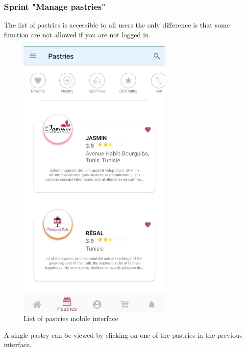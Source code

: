 \documentclass[12pt,a4paper]{report}
\begin{document}
\subsubsection*{Sprint "Manage pastries"}
The list of pastries is accessible to all users the only difference is that some function are not allowed if you are not logged in.
\begin{figure}[H]
	\centering
	\includegraphics[width=3in,keepaspectratio]{pastriesListmobile.jpg}
	\caption{List of pastries mobile interface}
	\label{pastriesListmobile-interface}
\end{figure}
A single pastry can be viewed by clicking on one of the pastries in the previous interface.
\end{document}
